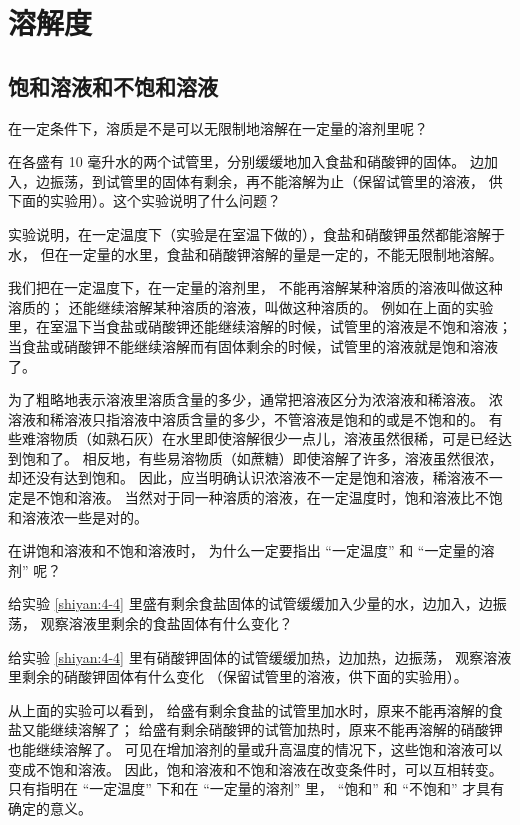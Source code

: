 \section{溶解度}\label{sec:4-3}

\subsection{饱和溶液和不饱和溶液}

在一定条件下，溶质是不是可以无限制地溶解在一定量的溶剂里呢？

\begin{shiyan}\label{shiyan:4-4}
    在各盛有 10 毫升水的两个试管里，分别缓缓地加入食盐和硝酸钾的固体。
    边加入，边振荡，到试管里的固体有剩余，再不能溶解为止（保留试管里的溶液，
    供下面的实验用）。这个实验说明了什么问题？
\end{shiyan}

实验说明，在一定温度下（实验是在室温下做的），食盐和硝酸钾虽然都能溶解于水，
但在一定量的水里，食盐和硝酸钾溶解的量是一定的，不能无限制地溶解。

我们把在一定温度下，在一定量的溶剂里，
不能再溶解某种溶质的溶液叫做这种溶质的；
还能继续溶解某种溶质的溶液，叫做这种溶质的。
例如在上面的实验里，在室温下当食盐或硝酸钾还能继续溶解的时候，试管里的溶液是不饱和溶液；
当食盐或硝酸钾不能继续溶解而有固体剩余的时候，试管里的溶液就是饱和溶液了。

为了粗略地表示溶液里溶质含量的多少，通常把溶液区分为浓溶液和稀溶液。
浓溶液和稀溶液只指溶液中溶质含量的多少，不管溶液是饱和的或是不饱和的。
有些难溶物质（如熟石灰）在水里即使溶解很少一点儿，溶液虽然很稀，可是已经达到饱和了。
相反地，有些易溶物质（如蔗糖）即使溶解了许多，溶液虽然很浓，却还没有达到饱和。
因此，应当明确认识浓溶液不一定是饱和溶液，稀溶液不一定是不饱和溶液。
当然对于同一种溶质的溶液，在一定温度时，饱和溶液比不饱和溶液浓一些是对的。

在讲饱和溶液和不饱和溶液时， 为什么一定要指出 “一定温度” 和 “一定量的溶剂” 呢？

\begin{shiyan}\label{shiyan:4-5}
    给实验 \ref{shiyan:4-4} 里盛有剩余食盐固体的试管缓缓加入少量的水，边加入，边振荡，
    观察溶液里剩余的食盐固体有什么变化？

    给实验 \ref{shiyan:4-4} 里有硝酸钾固体的试管缓缓加热，边加热，边振荡，
    观察溶液里剩余的硝酸钾固体有什么变化
    （保留试管里的溶液，供下面的实验用）。
\end{shiyan}

从上面的实验可以看到，
给盛有剩余食盐的试管里加水时，原来不能再溶解的食盐又能继续溶解了；
给盛有剩余硝酸钾的试管加热时，原来不能再溶解的硝酸钾也能继续溶解了。
可见在增加溶剂的量或升高温度的情况下，这些饱和溶液可以变成不饱和溶液。
因此，饱和溶液和不饱和溶液在改变条件时，可以互相转变。
只有指明在 “一定温度” 下和在 “一定量的溶剂” 里，
“饱和” 和 “不饱和” 才具有确定的意义。


